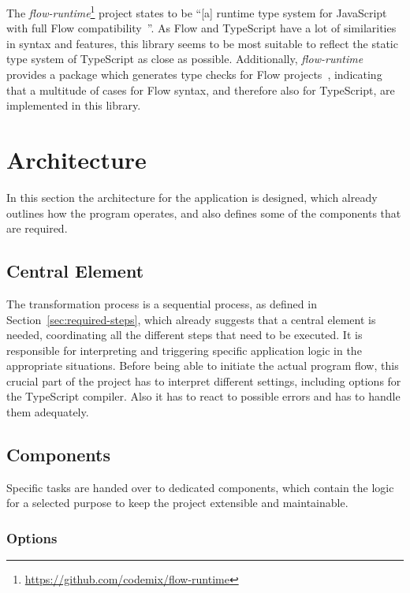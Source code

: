 The \emph{flow-runtime}\footnote{\url{https://github.com/codemix/flow-runtime}} project states to be ``[a] runtime type system for JavaScript with full Flow compatibility~\cite{RuntimeTypeSystem:flow-runtime:lib}''. As Flow and TypeScript have a lot of similarities in syntax and features, this library seems to be most suitable to reflect the static type system of TypeScript as close as possible. Additionally, \emph{flow-runtime} provides a package which generates type checks for Flow projects~\cite{RuntimeTypeSystem:flow-runtime:babel}, indicating that a multitude of cases for Flow syntax, and therefore also for TypeScript, are implemented in this library.

\pagebreak[4]

\section{Architecture}
\label{sec:architecture}

In this section the architecture for the application is designed, which already outlines how the program operates, and also defines some of the components that are required.

\subsection{Central Element}

The transformation process is a sequential process, as defined in Section~\ref{sec:required-steps}, which already suggests that a central element is needed, coordinating all the different steps that need to be executed. It is responsible for interpreting and triggering specific application logic in the appropriate situations. Before being able to initiate the actual program flow, this crucial part of the project has to interpret different settings, including options for the TypeScript compiler. Also it has to react to possible errors and has to handle them adequately.

\subsection{Components}

Specific tasks are handed over to dedicated components, which contain the logic for a selected purpose to keep the project extensible and maintainable.

\subsubsection{Options}

